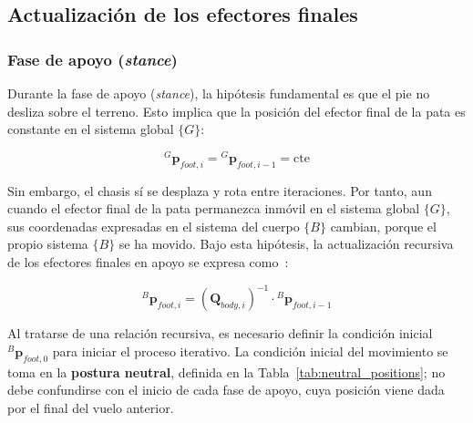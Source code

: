 \subsection{Actualización de los efectores finales}

\subsubsection{Fase de apoyo (\textit{stance})}

Durante la fase de apoyo (\textit{stance}), la hipótesis fundamental es que el pie no desliza sobre el terreno. Esto implica que la posición del efector final de la pata es constante en el sistema global $\{G\}$:

\vspace{-0.5\baselineskip}
\begin{equation}
    {}^{G}\bm{p}_{foot, i} = {}^{G}\bm{p}_{foot, i-1} = \text{cte}
\end{equation}

Sin embargo, el chasis sí se desplaza y rota entre iteraciones. Por tanto, aun cuando el efector final de la pata permanezca inmóvil en el sistema global $\{G\}$, sus coordenadas expresadas en el sistema del cuerpo $\{B\}$ cambian, porque el propio sistema $\{B\}$ se ha movido. Bajo esta hipótesis, la actualización recursiva de los efectores finales en apoyo se expresa como~\cite{arrigoni2024control}:

\vspace{-0.5\baselineskip}
\begin{equation}
    {}^{B}{\bm{p}}_{foot,i}
    =
    \left( \mathbf{Q}_{body,i} \right)^{-1} \cdot {}^{B}{\bm{p}}_{foot,i-1}
    \label{eq:stance_update}
\end{equation}

Al tratarse de una relación recursiva, es necesario definir la condición inicial ${}^{B}{\bm{p}}_{foot,0}$ para iniciar el proceso iterativo. La condición inicial del movimiento se toma en la \textbf{postura neutral}, definida en la Tabla~\ref{tab:neutral_positions}; no debe confundirse con el inicio de cada fase de apoyo, cuya posición viene dada por el final del vuelo anterior.

